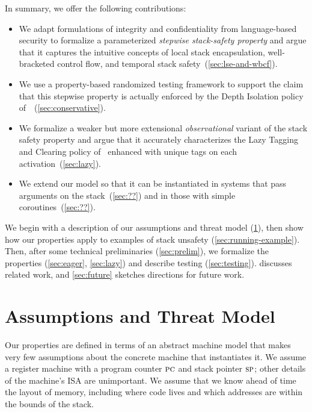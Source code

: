 \documentclass[acmsmall,review,anonymous]{acmart}\settopmatter{printfolios=true,printccs=false,printacmref=false}
\begin{document}
In summary, we offer the following contributions: 
\begin{itemize}
\item
  We adapt formulations of integrity and confidentiality from
  language-based security
  to formalize a parameterized {\em stepwise stack-safety property}  and argue that
  it captures the intuitive concepts of local stack encapsulation, well-bracketed control
  flow, and temporal stack safety~(\cref{sec:lse-and-wbcf}).
\item
  We use a property-based randomized testing framework to support the claim
  that this stepwise property is actually enforced by the Depth Isolation policy
  of~\citet{DBLP:conf/sp/RoesslerD18}~(\cref{sec:conservative}).
\item
  We formalize a weaker but more extensional \emph{observational} variant of the
  stack safety property and argue that it accurately characterizes
  the Lazy Tagging and Clearing policy of~\citet{DBLP:conf/sp/RoesslerD18}
  enhanced with unique tags on each activation~(\cref{sec:lazy}).
\item
  We extend our model so that it can be instantiated in systems that pass arguments
  on the stack~(\cref{sec:??}) and in those with simple coroutines~(\cref{sec:??}).
\end{itemize}

We begin with a description of our assumptions and threat model (\cref{sec:threat}),
then show how our properties apply to examples of stack unsafety 
(\cref{sec:running-example}). Then, after some technical preliminaries
(\cref{sec:prelim}), we formalize the properties (\cref{sec:eager}, \cref{sec:lazy})
and describe testing (\cref{sec:testing}).
 discusses related work, and
\cref{sec:future} sketches directions for future work.

\section{Assumptions and Threat Model}
\label{sec:threat}

\newcommand*{\rsp}{\textsc{sp}}

Our properties are defined in terms of an abstract machine model that makes very few
assumptions about the concrete machine that instantiates it.  We assume a register
machine with a program counter \(\textsc{pc}\) and stack pointer \(\rsp\); other
details of the machine's ISA are unimportant. We assume that we know ahead of time
the layout of memory, including where code lives and which addresses are within
the bounds of the stack.
\end{document}
